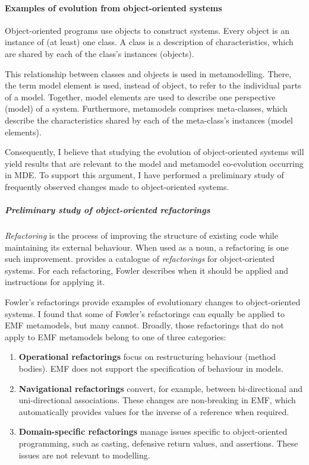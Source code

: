 \paragraph{Examples of evolution from object-oriented systems} %
\label{par:examples_of_evolution_from_object_oriented_systems}
Object-oriented programs use objects to construct systems. Every object is an instance of (at least) one class. A class is a description of characteristics, which are shared by each of the class's instances (objects).

This relationship between classes and objects is used in metamodelling. There, the term model element is used, instead of object, to refer to the individual parts of a model. Together, model elements are used to describe one perspective (model) of a system. Furthermore, metamodels comprises meta-classes, which describe the characteristics shared by each of the meta-class's instances (model elements).

Consequently, I believe that studying the evolution of object-oriented systems will yield results that are relevant to the model and metamodel co-evolution occurring in MDE. To support this argument, I have performed a preliminary study of frequently observed changes made to object-oriented systems.

\subparagraph{Preliminary study of object-oriented refactorings} %
\label{subp:preliminary_study_of_object_oriented_refactorings}
\emph{Refactoring} is the process of improving the structure of existing code while maintaining its external behaviour. When used as a noun, a refactoring is one such improvement. \cite{fowler99refactoring} provides a catalogue of \emph{refactorings} for object-oriented systems. For each refactoring, Fowler describes when it should be applied and instructions for applying it. 

Fowler's refactorings provide examples of evolutionary changes to object-oriented systems. I found that some of Fowler's refactorings can equally be applied to EMF metamodels, but many cannot. Broadly, those refactorings that do not apply to EMF metamodels belong to one of three categories:

\begin{enumerate}
	\item \textbf{Operational refactorings} focus on restructuring behaviour (method bodies). EMF does not support the specification of behaviour in models.
	\item \textbf{Navigational refactorings} convert, for example, between bi-directional and uni-directional associations. These changes are non-breaking in EMF, which automatically provides values for the inverse of a reference when required.
	\item \textbf{Domain-specific refactorings} manage issues specific to object-oriented programming, such as casting, defensive return values, and assertions. These issues are not relevant to modelling.
\end{enumerate}

